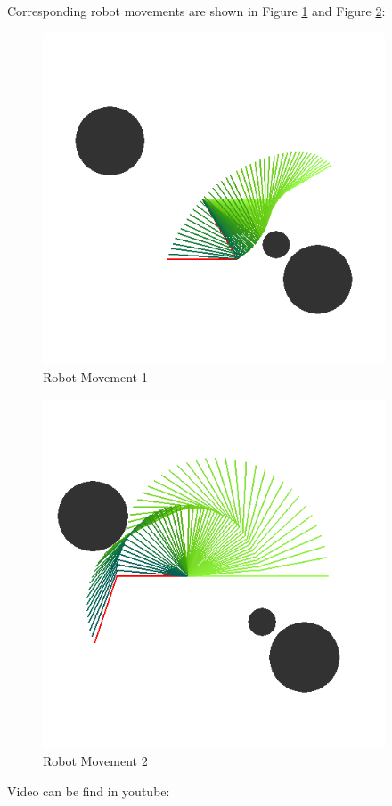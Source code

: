 \documentclass{article}
\begin{document}
    Corresponding robot movements are shown in Figure \ref{fig:move1} and Figure \ref{fig:move2}:

    \begin{figure}[h]
      \centering
      \includegraphics[width=4in]{Movement1.PNG}
      \caption{Robot Movement 1}
      \label{fig:move1}
    \end{figure}

    \begin{figure}[h]
      \centering
      \includegraphics[width=4in]{Movement2.PNG}
      \caption{Robot Movement 2}
      \label{fig:move2}
    \end{figure}

    Video can be find in youtube: 
    
\end{document}
